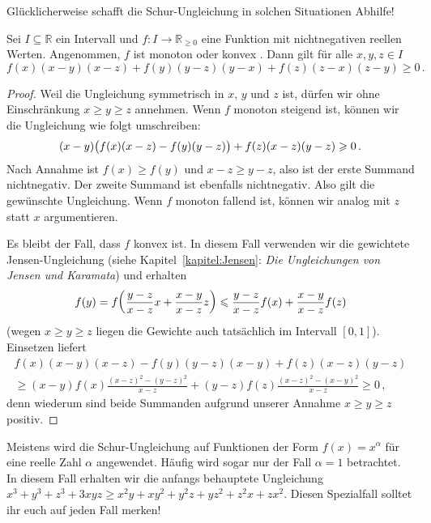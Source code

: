 Glücklicherweise schafft die Schur-Ungleichung in solchen Situationen Abhilfe!
\begin{satzmitnamen}
	Sei $I\subseteq \mathbb R$ ein Intervall und $f\colon I\rightarrow \mathbb R_{\geqslant 0}$ eine Funktion mit nichtnegativen reellen Werten. Angenommen, $f$ ist monoton  oder konvex . Dann gilt für alle $x,y,z\in I$
	\begin{equation*}
		f(x)(x-y)(x-z)+f(y)(y-z)(y-x)+f(z)(z-x)(z-y)\geqslant 0\,.
	\end{equation*}
\end{satzmitnamen}
\begin{proof}
	Weil die Ungleichung symmetrisch in $x$, $y$ und $z$ ist, dürfen wir ohne Einschränkung $x\geqslant y\geqslant z$ annehmen. Wenn $f$ monoton steigend ist, können wir die Ungleichung wie folgt umschreiben:
	\begin{equation*}
		(x-y)\parens[\big]{f(x)(x-z)-f(y)(y-z)}+f(z)(x-z)(y-z)\geqslant 0\,.
	\end{equation*}
	Nach Annahme ist $f(x)\geqslant f(y)$ und $x-z\geqslant y-z$, also ist der erste Summand nichtnegativ. Der zweite Summand ist ebenfalls nichtnegativ. Also gilt die gewünschte Ungleichung. Wenn $f$ monoton fallend ist, können wir analog mit $z$ statt $x$ argumentieren.
	
	Es bleibt der Fall, dass $f$ konvex ist. In diesem Fall verwenden wir die gewichtete Jensen-Ungleichung (siehe Kapitel~\ref{kapitel:Jensen}: \emph{Die Ungleichungen von Jensen und Karamata}) und erhalten
	\begin{equation*}
		f(y)=f\parens*{\frac{y-z}{x-z}x+\frac{x-y}{x-z}z}\leqslant \frac{y-z}{x-z}f(x)+\frac{x-y}{x-z}f(z)
	\end{equation*}
	(wegen $x\geqslant y\geqslant z$ liegen die Gewichte auch tatsächlich im Intervall $[0,1]$). Einsetzen liefert
	\begin{multline*}
		f(x)(x-y)(x-z)-f(y)(y-z)(x-y)+f(z)(x-z)(y-z)\\
		\geqslant(x-y)f(x)\frac{(x-z)^2-(y-z)^2}{x-z}+(y-z)f(z)\frac{(x-z)^2-(x-y)^2}{x-z}\geqslant 0\,,
	\end{multline*}
	denn wiederum sind beide Summanden aufgrund unserer Annahme $x\geqslant y\geqslant z$ positiv.
\end{proof}

Meistens wird die Schur-Ungleichung auf Funktionen der Form $f(x)=x^\alpha$ für eine reelle Zahl $\alpha$ angewendet. Häufig wird sogar nur der Fall $\alpha=1$ betrachtet. In diesem Fall erhalten wir die anfangs behauptete Ungleichung $x^3+y^3+z^3+3xyz\geqslant x^2y+xy^2+y^2z+yz^2+z^2x+zx^2$. Diesen Spezialfall solltet ihr euch auf jeden Fall merken!

